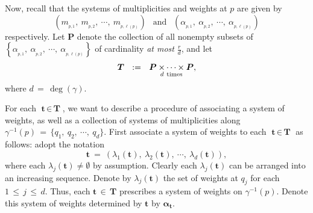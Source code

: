 \documentclass[10pt,reqno]{amsart}
\theoremstyle{myroman}
\numberwithin{equation}{section}
\begin{document}
	Now, recall that the systems of multiplicities and weights at $p$ are given by
	$$\left(m_{_{p,1}},\ m_{_{p,2}},\ \cdots,\ m_{_{p,\ell(p)}}\right)\ \ \text{ and }\  \
	\left(\alpha_{_{p,1}},\ \alpha_{_{p,2}},\ \cdots ,\ \alpha_{_{p,\ell(p)}}\right)$$
	respectively. Let $\boldsymbol{P}$ denote the collection of all nonempty subsets of $\left\{\alpha_{_{p,1}}, \ \alpha_{_{p,2}}, \ \cdots, \ \alpha_{_{p,\ell(p)}}\right\}$ of cardinality \textit{at most} $\frac{r}{d}$, and let 
	\begin{equation}\label{eqn:set-of-subsets}
		\boldsymbol{T}\ \ :=\ \ \boldsymbol{P}\underset{d\ \textnormal{times}}{\times \cdots\times}\boldsymbol{P},
	\end{equation}
	where $d\,=\,\deg(\gamma)$.
	
	For each $\textbf{t}\,\in\, \textbf{T}$, we want to describe a procedure of associating a system of weights, as 
	well as a collection of systems of multiplicities along $\gamma^{-1}(p)\,=\,\{q_1,\ q_2,\ \cdots,\ q_d\}$. 
	First associate a system of weights to each $\textbf{t}\,\in \,\textbf{T}$ as follows: adopt the notation
	\begin{equation}\label{eqn:set-of-subsets-2}
		\textbf{t} \ =\ \left(\lambda_1(\textbf{t}),\ \lambda_2(\textbf{t}), \ \cdots ,\
		\lambda_d(\textbf{t})\right),
	\end{equation}
	where each $\lambda_j(\textbf{t})\neq \emptyset$ by assumption. Clearly each $\lambda_j(\textbf{t})$ can be 
	arranged into an increasing sequence. Denote by $\lambda_j(\textbf{t})$ the set of weights at $q_j$ for 
	each $1\,\leq\, j\,\leq\, d$. Thus, each $\textbf{t}\,\in\, \boldsymbol{T}$ prescribes a system of weights on 
	$\gamma^{-1}(p)$. Denote this system of weights determined by $\textbf{t}$ by
	$\boldsymbol{\alpha}_{\textbf{t}}$.
	
\end{document}
